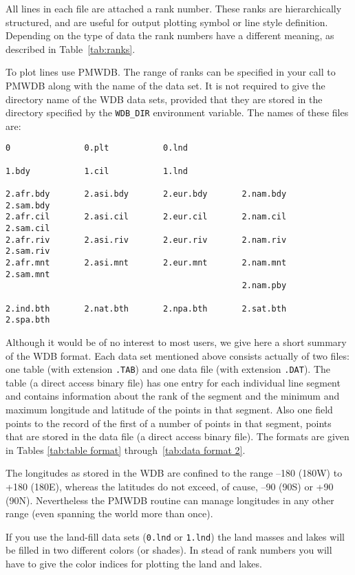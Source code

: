 \documentclass[titlepage,a4paper]{article}
\begin{document}
All lines in each file are attached a rank number. These ranks are
hierarchically structured, and are useful for output plotting symbol or
line style definition. Depending on the type of data the rank numbers have
a different meaning, as described in Table~\ref{tab:ranks}.
\clearpage


To plot lines use PMWDB. The range of ranks can be specified in your call to
PMWDB along with the name of the data set. It is not required to give
the directory name of the WDB data sets, provided that they are stored in
the directory specified by the \verb|WDB_DIR| environment variable.
The names of these files are:

\begin{verbatim}
0               0.plt           0.lnd

1.bdy           1.cil           1.lnd

2.afr.bdy       2.asi.bdy       2.eur.bdy       2.nam.bdy       2.sam.bdy
2.afr.cil       2.asi.cil       2.eur.cil       2.nam.cil       2.sam.cil
2.afr.riv       2.asi.riv       2.eur.riv       2.nam.riv       2.sam.riv
2.afr.mnt       2.asi.mnt       2.eur.mnt       2.nam.mnt       2.sam.mnt
                                                2.nam.pby

2.ind.bth       2.nat.bth       2.npa.bth       2.sat.bth       2.spa.bth
\end{verbatim}

Although it would be of no interest to most users, we give here a short summary
of the WDB format.
Each data set mentioned above consists actually of two files: one table (with
extension \verb|.TAB|) and one data file (with extension \verb|.DAT|). The table (a direct
access binary file) has one entry for each individual line segment and contains
information about the rank of the segment and the minimum and maximum longitude
and latitude of the points in that segment. Also one field points to the record
of the first of a number of points in that segment, points that are stored in
the data file (a direct access binary file). The formats are given in Tables
\ref{tab:table format} through~\ref{tab:data format 2}.


The longitudes as stored in the WDB are confined to the range --180 (180W) to
+180 (180E), whereas the latitudes do not exceed, of cause, --90 (90S) or
+90 (90N). Nevertheless the PMWDB routine can manage longitudes in any
other range (even spanning the world more than once).

If you use the land-fill data sets (\verb|0.lnd| or \verb|1.lnd|) the
land masses and lakes will be filled in two different colors (or shades).
In stead of rank numbers you will have to give the color indices for
plotting the land and lakes.
\end{document}
